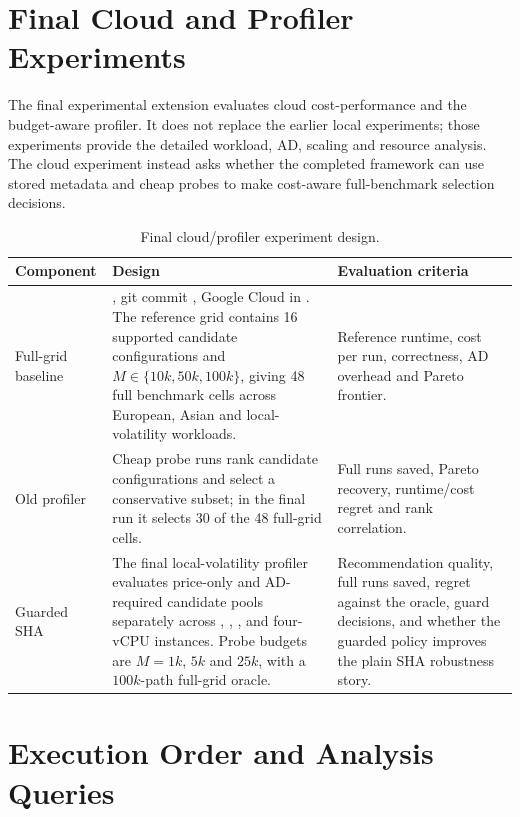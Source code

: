 \section{Final Cloud and Profiler Experiments}
\label{sec:exp-cloud-profiler}

The final experimental extension evaluates cloud cost-performance and the
budget-aware profiler. It does not replace the earlier local experiments; those
experiments provide the detailed workload, AD, scaling and resource analysis.
The cloud experiment instead asks whether the completed framework can use stored
metadata and cheap probes to make cost-aware full-benchmark selection decisions.

\begin{table}[htbp]
\centering
\footnotesize
\caption{Final cloud/profiler experiment design.}
\label{tab:cloud-profiler-design}
\begin{tabularx}{\textwidth}{p{}Y p{0.25\textwidth}}
\toprule
\textbf{Component} & \textbf{Design} & \textbf{Evaluation criteria} \\
\midrule
Full-grid baseline &
, git commit , Google Cloud
 in . The reference grid contains 16
supported candidate configurations and \(M\in\{10k,50k,100k\}\), giving 48 full
benchmark cells across European, Asian and local-volatility workloads. &
Reference runtime, cost per run, correctness, AD overhead and Pareto frontier. \\

Old profiler &
Cheap probe runs rank candidate configurations and select a conservative subset;
in the final run it selects 30 of the 48 full-grid cells. &
Full runs saved, Pareto recovery, runtime/cost regret and rank correlation. \\

Guarded SHA &
The final local-volatility profiler evaluates price-only and AD-required
candidate pools separately across , , , 
and  four-vCPU instances. Probe budgets are \(M=1k\), \(5k\) and
\(25k\), with a \(100k\)-path full-grid oracle. &
Recommendation quality, full runs saved, regret against the oracle, guard
decisions, and whether the guarded policy improves the plain SHA robustness
story. \\
\bottomrule
\end{tabularx}
\end{table}

\section{Execution Order and Analysis Queries}
\label{sec:exp-execution-order}

